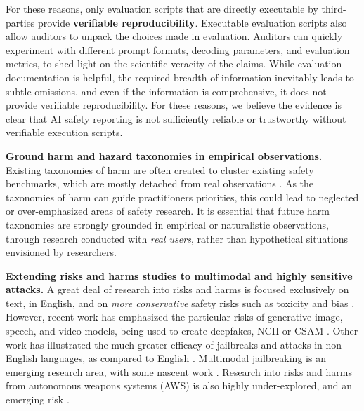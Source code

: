 For these reasons, only evaluation scripts that are directly executable by third-parties provide \textbf{verifiable reproducibility}.
Executable evaluation scripts also allow auditors to unpack the choices made in evaluation. 
Auditors can quickly experiment with different prompt formats, decoding parameters, and evaluation metrics, to shed light on the scientific veracity of the claims.
While evaluation documentation is helpful, the required breadth of information inevitably leads to subtle omissions, and even if the information is comprehensive, it does not provide verifiable reproducibility.
For these reasons, we believe the evidence is clear that AI safety reporting is not sufficiently reliable or trustworthy without verifiable execution scripts.

\textbf{Ground harm and hazard taxonomies in empirical observations.}
Existing taxonomies of harm are often created to cluster existing safety benchmarks, which are mostly detached from real observations \citep{sun2024trustllm,zhang2023safetybench,hendrycks2023overview}.
As the taxonomies of harm can guide practitioners priorities, this could lead to neglected or over-emphasized areas of safety research.
It is essential that future harm taxonomies are strongly grounded in empirical or naturalistic observations, through research conducted with \emph{real users}, rather than hypothetical situations envisioned by researchers.

\textbf{Extending risks and harms studies to multimodal and highly sensitive attacks.}
A great deal of research into risks and harms is focused exclusively on text, in English, and on \emph{more conservative} safety risks such as toxicity and bias \citep{gehman-etal-2020-realtoxicityprompts,hartvigsen2022toxigen}.
However, recent work has emphasized the particular risks of generative image, speech, and video models, being used to create deepfakes, NCII or CSAM  \citep{kapoor2024societal, thiel2023generative, lakatos2023revealing}. 
Other work has illustrated the much greater efficacy of jailbreaks and attacks in non-English languages, as compared to English \citep{yong2023low}.
Multimodal jailbreaking is an emerging research area, with some nascent work \citep{qi2024visual, shayegani2023jailbreak, niu2024jailbreaking}.
Research into risks and harms from autonomous weapons systems (AWS) is also highly under-explored, and an emerging risk \citep{simmons2024ai, longpre2022lethal}.
